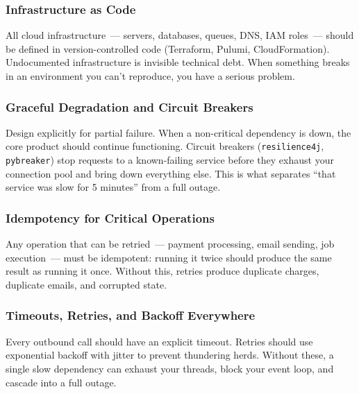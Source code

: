 \subsubsection*{Infrastructure as Code}\label{writing-good-code:infrastructure-as-code}

All cloud infrastructure~--- servers, databases, queues, DNS, IAM roles~--- should be defined in version-controlled code (Terraform, Pulumi, CloudFormation). Undocumented infrastructure is invisible technical debt. When something breaks in an environment you can't reproduce, you have a serious problem.

\subsubsection*{Graceful Degradation and Circuit Breakers}\label{writing-good-code:graceful-degradation-and-circuit-breakers}

Design explicitly for partial failure. When a non-critical dependency is down, the core product should continue functioning. Circuit breakers (\texttt{resilience4j}, \texttt{pybreaker}) stop requests to a known-failing service before they exhaust your connection pool and bring down everything else. This is what separates ``that service was slow for 5 minutes'' from a full outage.

\subsubsection*{Idempotency for Critical Operations}\label{writing-good-code:idempotency-for-critical-operations}

Any operation that can be retried~--- payment processing, email sending, job execution~--- must be idempotent: running it twice should produce the same result as running it once. Without this, retries produce duplicate charges, duplicate emails, and corrupted state.

\subsubsection*{Timeouts, Retries, and Backoff Everywhere}\label{writing-good-code:timeouts-retries-and-backoff-everywhere}

Every outbound call should have an explicit timeout. Retries should use exponential backoff with jitter to prevent thundering herds. Without these, a single slow dependency can exhaust your threads, block your event loop, and cascade into a full outage.

